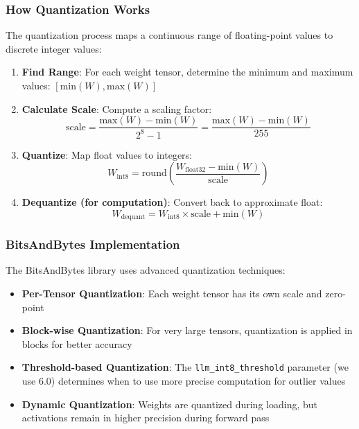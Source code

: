 \documentclass[conference]{IEEEtran}
\begin{document}
\subsubsection{How Quantization Works}

The quantization process maps a continuous range of floating-point values to discrete integer values:

\begin{enumerate}
    \item \textbf{Find Range}: For each weight tensor, determine the minimum and maximum values: $[\text{min}(W), \text{max}(W)]$
    
    \item \textbf{Calculate Scale}: Compute a scaling factor:
    \begin{equation}
    \text{scale} = \frac{\text{max}(W) - \text{min}(W)}{2^8 - 1} = \frac{\text{max}(W) - \text{min}(W)}{255}
    \end{equation}
    
    \item \textbf{Quantize}: Map float values to integers:
    \begin{equation}
    W_{\text{int8}} = \text{round}\left(\frac{W_{\text{float32}} - \text{min}(W)}{\text{scale}}\right)
    \end{equation}
    
    \item \textbf{Dequantize (for computation)}: Convert back to approximate float:
    \begin{equation}
    W_{\text{dequant}} = W_{\text{int8}} \times \text{scale} + \text{min}(W)
    \end{equation}
\end{enumerate}

\subsubsection{BitsAndBytes Implementation}

The BitsAndBytes library uses advanced quantization techniques:

\begin{itemize}
    \item \textbf{Per-Tensor Quantization}: Each weight tensor has its own scale and zero-point
    \item \textbf{Block-wise Quantization}: For very large tensors, quantization is applied in blocks for better accuracy
    \item \textbf{Threshold-based Quantization}: The \texttt{llm\_int8\_threshold} parameter (we use 6.0) determines when to use more precise computation for outlier values
    \item \textbf{Dynamic Quantization}: Weights are quantized during loading, but activations remain in higher precision during forward pass
\end{itemize}
\end{document}
